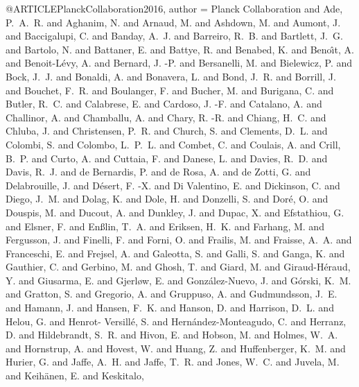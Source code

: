 @ARTICLE{PlanckCollaboration2016,
       author = {{Planck Collaboration} and {Ade}, P.~A.~R. and {Aghanim}, N. and
        {Arnaud}, M. and {Ashdown}, M. and {Aumont}, J. and
        {Baccigalupi}, C. and {Banday}, A.~J. and {Barreiro}, R.~B. and
        {Bartlett}, J.~G. and {Bartolo}, N. and {Battaner}, E. and
        {Battye}, R. and {Benabed}, K. and {Beno{\^\i}t}, A. and
        {Benoit-L{\'e}vy}, A. and {Bernard}, J. -P. and {Bersanelli}, M.
        and {Bielewicz}, P. and {Bock}, J.~J. and {Bonaldi}, A. and
        {Bonavera}, L. and {Bond}, J.~R. and {Borrill}, J. and
        {Bouchet}, F.~R. and {Boulanger}, F. and {Bucher}, M. and
        {Burigana}, C. and {Butler}, R.~C. and {Calabrese}, E. and
        {Cardoso}, J. -F. and {Catalano}, A. and {Challinor}, A. and
        {Chamballu}, A. and {Chary}, R. -R. and {Chiang}, H.~C. and
        {Chluba}, J. and {Christensen}, P.~R. and {Church}, S. and
        {Clements}, D.~L. and {Colombi}, S. and {Colombo}, L.~P.~L. and
        {Combet}, C. and {Coulais}, A. and {Crill}, B.~P. and {Curto},
        A. and {Cuttaia}, F. and {Danese}, L. and {Davies}, R.~D. and
        {Davis}, R.~J. and {de Bernardis}, P. and {de Rosa}, A. and {de
        Zotti}, G. and {Delabrouille}, J. and {D{\'e}sert}, F. -X. and
        {Di Valentino}, E. and {Dickinson}, C. and {Diego}, J.~M. and
        {Dolag}, K. and {Dole}, H. and {Donzelli}, S. and {Dor{\'e}}, O.
        and {Douspis}, M. and {Ducout}, A. and {Dunkley}, J. and
        {Dupac}, X. and {Efstathiou}, G. and {Elsner}, F. and
        {En{\ss}lin}, T.~A. and {Eriksen}, H.~K. and {Farhang}, M. and
        {Fergusson}, J. and {Finelli}, F. and {Forni}, O. and {Frailis},
        M. and {Fraisse}, A.~A. and {Franceschi}, E. and {Frejsel}, A.
        and {Galeotta}, S. and {Galli}, S. and {Ganga}, K. and
        {Gauthier}, C. and {Gerbino}, M. and {Ghosh}, T. and {Giard}, M.
        and {Giraud-H{\'e}raud}, Y. and {Giusarma}, E. and {Gjerl{\o}w},
        E. and {Gonz{\'a}lez-Nuevo}, J. and {G{\'o}rski}, K.~M. and
        {Gratton}, S. and {Gregorio}, A. and {Gruppuso}, A. and
        {Gudmundsson}, J.~E. and {Hamann}, J. and {Hansen}, F.~K. and
        {Hanson}, D. and {Harrison}, D.~L. and {Helou}, G. and {Henrot-
        Versill{\'e}}, S. and {Hern{\'a}ndez-Monteagudo}, C. and
        {Herranz}, D. and {Hildebrandt}, S.~R. and {Hivon}, E. and
        {Hobson}, M. and {Holmes}, W.~A. and {Hornstrup}, A. and
        {Hovest}, W. and {Huang}, Z. and {Huffenberger}, K.~M. and
        {Hurier}, G. and {Jaffe}, A.~H. and {Jaffe}, T.~R. and {Jones},
        W.~C. and {Juvela}, M. and {Keih{\"a}nen}, E. and {Keskitalo},
}}
